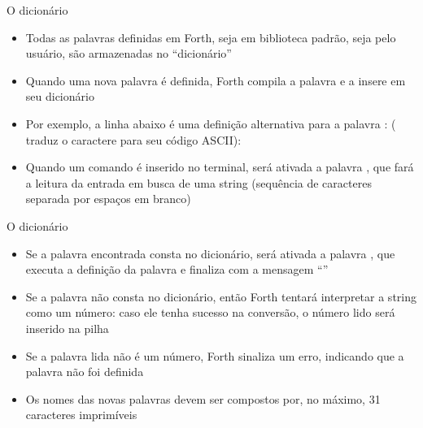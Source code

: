 \begin{frame}[fragile]{O dicionário}

    \begin{itemize}
        \item Todas as palavras definidas em Forth, seja em biblioteca padrão, seja pelo usuário, são
            armazenadas no ``dicionário''

        \item Quando uma nova palavra é definida, Forth compila a palavra e a insere em seu dicionário

        \item Por exemplo, a linha abaixo é uma definição alternativa para a palavra :
            ( traduz o caractere para seu código ASCII):


        \item Quando um comando é inserido no terminal, 
            será ativada a palavra , que fará a leitura da entrada em busca
            de uma string (sequência de caracteres separada por espaços em branco)
    \end{itemize}

\end{frame}

\begin{frame}[fragile]{O dicionário}

    \begin{itemize}
        \item Se a palavra encontrada consta no dicionário,
            será ativada a palavra , que executa a definição da palavra e 
            finaliza com a mensagem ``''

        \item Se a palavra não consta no dicionário, então Forth tentará interpretar a string
            como um número: caso ele tenha sucesso na conversão, o número lido será 
            inserido na pilha

        \item Se a palavra lida não é um número, Forth sinaliza um erro, indicando que a palavra
            não foi definida

        \item Os nomes das novas palavras devem ser compostos por, no máximo, 31 caracteres imprimíveis
    \end{itemize}

\end{frame}
